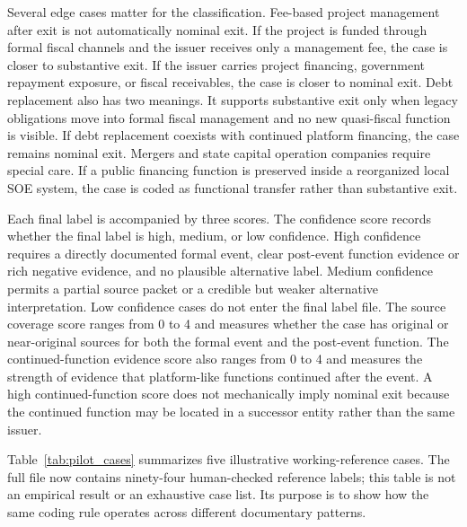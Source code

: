 Several edge cases matter for the classification. Fee-based project management
after exit is not automatically nominal exit. If the project is funded through
formal fiscal channels and the issuer receives only a management fee, the case
is closer to substantive exit. If the issuer carries project financing,
government repayment exposure, or fiscal receivables, the case is closer to
nominal exit. Debt replacement also has two meanings. It supports substantive
exit only when legacy obligations move into formal fiscal management and no
new quasi-fiscal function is visible. If debt replacement coexists with
continued platform financing, the case remains nominal exit. Mergers and state
capital operation companies require special care. If a public financing
function is preserved inside a reorganized local SOE system, the case is coded
as functional transfer rather than substantive exit.

Each final label is accompanied by three scores. The confidence score records
whether the final label is high, medium, or low confidence. High confidence
requires a directly documented formal event, clear post-event function
evidence or rich negative evidence, and no plausible alternative label. Medium
confidence permits a partial source packet or a credible but weaker
alternative interpretation. Low confidence cases do not enter the final label
file. The source coverage score ranges from 0 to 4 and measures whether the
case has original or near-original sources for both the formal event and the
post-event function. The continued-function evidence score also ranges from 0
to 4 and measures the strength of evidence that platform-like functions
continued after the event. A high continued-function score does not
mechanically imply nominal exit because the continued function may be located
in a successor entity rather than the same issuer.

Table~\ref{tab:pilot_cases} summarizes five illustrative working-reference
cases. The full file now contains ninety-four human-checked reference labels; this
table is not an empirical result or an exhaustive case list. Its purpose is to
show how the same coding rule operates across different documentary patterns.

